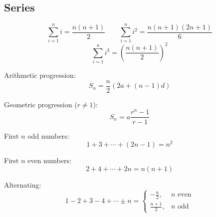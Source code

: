 \subsection{Series}
\[
\sum_{i=1}^{n} i=\frac{n(n+1)}{2}
\qquad
\sum_{i=1}^{n} i^2=\frac{n(n+1)(2n+1)}{6}
\]
\[
\sum_{i=1}^{n} i^3=
\left(\frac{n(n+1)}{2}\right)^2
\]

Arithmetic progression:
\[
S_n=\frac{n}{2}\left(2a+(n-1)d\right)
\]

Geometric progression ($r\neq1$):
\[
S_n=a\frac{r^n-1}{r-1}
\]

First $n$ odd numbers:
\[
1+3+\cdots +(2n-1)=n^2
\]

First $n$ even numbers:
\[
2+4+\cdots+2n=n(n+1)
\]

Alternating:
\[
1-2+3-4+\cdots\pm n=
\begin{cases}
-\frac n2,&n\text{ even}\\
\frac{n+1}{2},&n\text{ odd}
\end{cases}
\]
